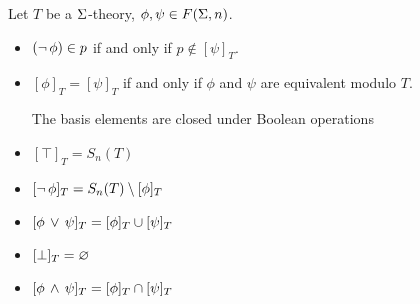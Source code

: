 \begin{prop}
    Let $T$ be a $\Sigma$-theory, $\phi, \psi \in F(\Sigma,n)$.
    \begin{itemize}
        \item $(\neg\, \phi) \in p$ if and only if $p \notin [\psi]_T$.
        \item $[\phi]_T = [\psi]_T$ if and only if $\phi$ and $\psi$ are 
            equivalent modulo $T$.

        The basis elements are closed under Boolean operations
        \item $[\top]_T = S_n(T)$
        \item $[\neg\, \phi]_T = S_n(T) \setminus [\phi]_T$
        \item $[\phi \, \lor \, \psi]_T = [\phi]_T \cup [\psi]_T$
        \item $[\bot]_T = \varnothing$
        \item $[\phi \, \land \, \psi]_T = [\phi]_T \cap [\psi]_T$
    \end{itemize}
\end{prop}
